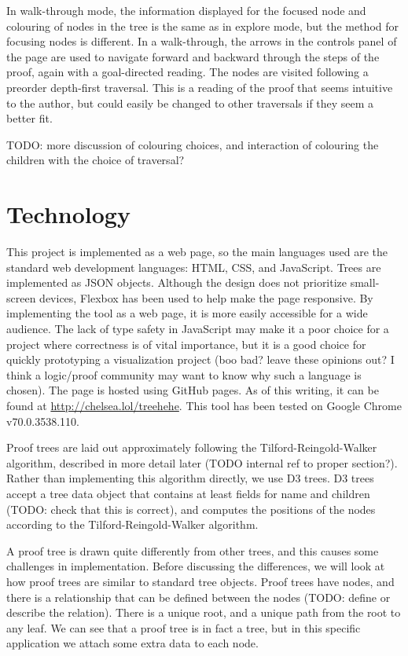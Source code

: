 \documentclass[conference]{IEEEtran}
\begin{document}
In walk-through mode, the information displayed for the focused node and colouring of nodes in the tree is the same as in explore mode, but the method for focusing nodes is different. In a walk-through, the arrows in the controls panel of the page are used to navigate forward and backward through the steps of the proof, again with a goal-directed reading. The nodes are visited following a preorder depth-first traversal. This is a reading of the proof that seems intuitive to the author, but could easily be changed to other traversals if they seem a better fit.

TODO: more discussion of colouring choices, and interaction of colouring the children with the choice of traversal? \\

\section{Technology}
\label{sec:technology}

This project is implemented as a web page, so the main languages used are the standard web development languages: HTML, CSS, and JavaScript. Trees are implemented as JSON objects. Although the design does not prioritize small-screen devices, Flexbox has been used to help make the page responsive. By implementing the tool as a web page, it is more easily accessible for a wide audience. The lack of type safety in JavaScript may make it a poor choice for a project where correctness is of vital importance, but it is a good choice for quickly prototyping a visualization project (boo bad? leave these opinions out? I think a logic/proof community may want to know why such a language is chosen). The page is hosted using GitHub pages. As of this writing, it can be found at \url{http://chelsea.lol/treehehe}. This tool has been tested on Google Chrome v70.0.3538.110.

Proof trees are laid out approximately following the Tilford-Reingold-Walker algorithm, described in more detail later (TODO internal ref to proper section?). Rather than implementing this algorithm directly, we use D3 trees. D3 trees accept a tree data object that contains at least fields for name and children (TODO: check that this is correct), and computes the positions of the nodes according to the Tilford-Reingold-Walker algorithm.

A proof tree is drawn quite differently from other trees, and this causes some challenges in implementation. Before discussing the differences, we will look at how proof trees are similar to standard tree objects. Proof trees have nodes, and there is a relationship that can be defined between the nodes (TODO: define or describe the relation). There is a unique root, and a unique path from the root to any leaf. We can see that a proof tree is in fact a tree, but in this specific application we attach some extra data to each node.
\end{document}
